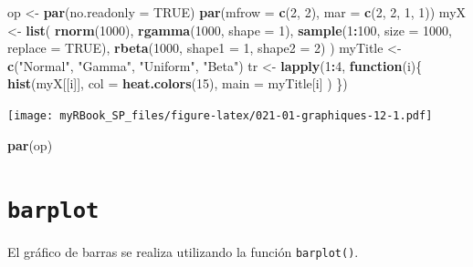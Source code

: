 \documentclass[
]{book}
\newenvironment{Shaded}{\begin{snugshade}}{\end{snugshade}}
\newcommand{\ControlFlowTok}[1]{\textcolor[rgb]{0.13,0.29,0.53}{\textbf{#1}}}
\newcommand{\DataTypeTok}[1]{\textcolor[rgb]{0.13,0.29,0.53}{#1}}
\newcommand{\DecValTok}[1]{\textcolor[rgb]{0.00,0.00,0.81}{#1}}
\newcommand{\KeywordTok}[1]{\textcolor[rgb]{0.13,0.29,0.53}{\textbf{#1}}}
\newcommand{\NormalTok}[1]{#1}
\newcommand{\OperatorTok}[1]{\textcolor[rgb]{0.81,0.36,0.00}{\textbf{#1}}}
\newcommand{\OtherTok}[1]{\textcolor[rgb]{0.56,0.35,0.01}{#1}}
\newcommand{\StringTok}[1]{\textcolor[rgb]{0.31,0.60,0.02}{#1}}
\begin{document}
\begin{Shaded}
\begin{Highlighting}[]
\NormalTok{op <-}\StringTok{ }\KeywordTok{par}\NormalTok{(}\DataTypeTok{no.readonly =} \OtherTok{TRUE}\NormalTok{)}
\KeywordTok{par}\NormalTok{(}\DataTypeTok{mfrow =} \KeywordTok{c}\NormalTok{(}\DecValTok{2}\NormalTok{, }\DecValTok{2}\NormalTok{), }\DataTypeTok{mar =} \KeywordTok{c}\NormalTok{(}\DecValTok{2}\NormalTok{, }\DecValTok{2}\NormalTok{, }\DecValTok{1}\NormalTok{, }\DecValTok{1}\NormalTok{))}
\NormalTok{myX <-}\StringTok{ }\KeywordTok{list}\NormalTok{(}
  \KeywordTok{rnorm}\NormalTok{(}\DecValTok{1000}\NormalTok{),}
  \KeywordTok{rgamma}\NormalTok{(}\DecValTok{1000}\NormalTok{, }\DataTypeTok{shape =} \DecValTok{1}\NormalTok{),}
  \KeywordTok{sample}\NormalTok{(}\DecValTok{1}\OperatorTok{:}\DecValTok{100}\NormalTok{, }\DataTypeTok{size =} \DecValTok{1000}\NormalTok{, }\DataTypeTok{replace =} \OtherTok{TRUE}\NormalTok{),}
  \KeywordTok{rbeta}\NormalTok{(}\DecValTok{1000}\NormalTok{, }\DataTypeTok{shape1 =} \DecValTok{1}\NormalTok{, }\DataTypeTok{shape2 =} \DecValTok{2}\NormalTok{)}
\NormalTok{)}
\NormalTok{myTitle <-}\StringTok{ }\KeywordTok{c}\NormalTok{(}\StringTok{"Normal"}\NormalTok{, }\StringTok{"Gamma"}\NormalTok{, }\StringTok{"Uniform"}\NormalTok{, }\StringTok{"Beta"}\NormalTok{)}
\NormalTok{tr <-}\StringTok{ }\KeywordTok{lapply}\NormalTok{(}\DecValTok{1}\OperatorTok{:}\DecValTok{4}\NormalTok{, }\ControlFlowTok{function}\NormalTok{(i)\{}
  \KeywordTok{hist}\NormalTok{(myX[[i]], }
    \DataTypeTok{col =} \KeywordTok{heat.colors}\NormalTok{(}\DecValTok{15}\NormalTok{), }
    \DataTypeTok{main =}\NormalTok{ myTitle[i]}
\NormalTok{  )}
\NormalTok{\})}
\end{Highlighting}
\end{Shaded}

\texttt{[image: myRBook\_SP\_files/figure-latex/021-01-graphiques-12-1.pdf]}

\begin{Shaded}
\begin{Highlighting}[]
\KeywordTok{par}\NormalTok{(op)}
\end{Highlighting}
\end{Shaded}

\hypertarget{graph1barplot}{%
\section{\texorpdfstring{\texttt{barplot}}{barplot}}\label{graph1barplot}}

El gráfico de barras se realiza utilizando la función \texttt{barplot()}.
\end{document}
